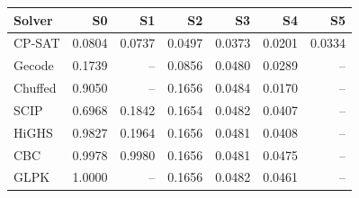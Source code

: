 \begin{tabular}{lrrrrrr}
\toprule
Solver & S0 & S1 & S2 & S3 & S4 & S5 \\
\midrule
CP-SAT & 0.0804 & 0.0737 & 0.0497 & 0.0373 & 0.0201 & 0.0334 \\
Gecode & 0.1739 & -- & 0.0856 & 0.0480 & 0.0289 & -- \\
Chuffed & 0.9050 & -- & 0.1656 & 0.0484 & 0.0170 & -- \\
SCIP & 0.6968 & 0.1842 & 0.1654 & 0.0482 & 0.0407 & -- \\
HiGHS & 0.9827 & 0.1964 & 0.1656 & 0.0481 & 0.0408 & -- \\
CBC & 0.9978 & 0.9980 & 0.1656 & 0.0481 & 0.0475 & -- \\
GLPK & 1.0000 & -- & 0.1656 & 0.0482 & 0.0461 & -- \\
\bottomrule
\end{tabular}
